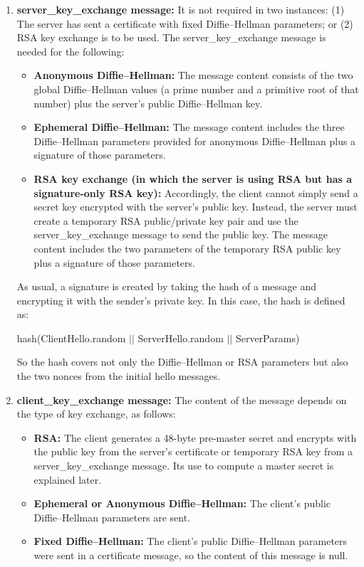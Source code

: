 \documentclass[11pt]{article}
\begin{document}
\begin{enumerate}
    \item \textbf{server\_key\_exchange message:} It is not required in two instances: (1) The server has sent a certificate with fixed Diffie–Hellman parameters; or (2) RSA key exchange is to be used. The server\_key\_exchange message is needed for the following:
    \begin{itemize}
        \item \textbf{Anonymous Diffie–Hellman:} The message content consists of the two global Diffie–Hellman values (a prime number and a primitive root of that number) plus the server’s public Diffie–Hellman key.
        \item \textbf{Ephemeral Diffie–Hellman:} The message content includes the three Diffie–Hellman parameters provided for anonymous Diffie–Hellman plus a signature of those parameters.
        \item \textbf{RSA key exchange (in which the server is using RSA but has a signature-only RSA key):} Accordingly, the client cannot simply send a secret key encrypted with the server’s public key. Instead, the server must create a temporary RSA public/private key pair and use the server\_key\_exchange message to send the public key. The message content includes the two parameters of the temporary RSA public key plus a signature of those parameters.
    \end{itemize}
    As usual, a signature is created by taking the hash of a message and encrypting it with the sender’s private key. In this case, the hash is defined as:
    \begin{center}
        hash(ClientHello.random $||$ ServerHello.random $||$ ServerParams)
    \end{center}
    So the hash covers not only the Diffie–Hellman or RSA parameters but also the two nonces from the initial hello messages.

    \item \textbf{client\_key\_exchange message:} The content of the message depends on the type of key exchange, as follows:
    \begin{itemize}
        \item \textbf{RSA:} The client generates a 48-byte pre-master secret and encrypts with the public key from the server’s certificate or temporary RSA key from a server\_key\_exchange message. Its use to compute a master secret is explained later.
        \item \textbf{Ephemeral or Anonymous Diffie–Hellman:} The client’s public Diffie–Hellman parameters are sent.
        \item \textbf{Fixed Diffie–Hellman:} The client’s public Diffie–Hellman parameters were sent in a certificate message, so the content of this message is null.
    \end{itemize}


\end{enumerate}
\end{document}

